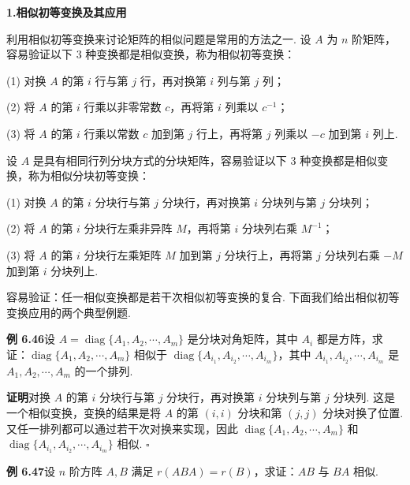 \documentclass[UTF8, 12pt, fontset=fandol, oneside]{ctexart}
\begin{document}
\noindent\textbf{1.\quad 相似初等变换及其应用}

利用相似初等变换来讨论矩阵的相似问题是常用的方法之一. 设 $A$ 为 $n$ 阶矩阵，容易验证以下 3 种变换都是相似变换，称为相似初等变换：

(1) 对换 $A$ 的第 $i$ 行与第 $j$ 行，再对换第 $i$ 列与第 $j$ 列；

(2) 将 $A$ 的第 $i$ 行乘以非零常数 $c$，再将第 $i$ 列乘以 $c^{-1}$；

(3) 将 $A$ 的第 $i$ 行乘以常数 $c$ 加到第 $j$ 行上，再将第 $j$ 列乘以 $-c$ 加到第 $i$ 列上.

设 $A$ 是具有相同行列分块方式的分块矩阵，容易验证以下 3 种变换都是相似变换，称为相似分块初等变换：

(1) 对换 $A$ 的第 $i$ 分块行与第 $j$ 分块行，再对换第 $i$ 分块列与第 $j$ 分块列；

(2) 将 $A$ 的第 $i$ 分块行左乘非异阵 $M$，再将第 $i$ 分块列右乘 $M^{-1}$；

(3) 将 $A$ 的第 $i$ 分块行左乘矩阵 $M$ 加到第 $j$ 分块行上，再将第 $j$ 分块列右乘 $-M$ 加到第 $i$ 分块列上.

容易验证：任一相似变换都是若干次相似初等变换的复合. 下面我们给出相似初等变换应用的两个典型例题.

\noindent\textbf{例 6.46}\quad 设 $A=\operatorname{diag}\{A_1,A_2,\cdots,A_m\}$ 是分块对角矩阵，其中 $A_i$ 都是方阵，求证：$\operatorname{diag}\{A_1,A_2,\cdots,A_m\}$ 相似于 $\operatorname{diag}\{A_{i_1},A_{i_2},\cdots,A_{i_m}\}$，其中 $A_{i_1},A_{i_2},\cdots,A_{i_m}$ 是 $A_1,A_2,\cdots,A_m$ 的一个排列.

\noindent\textbf{证明}\quad 对换 $A$ 的第 $i$ 分块行与第 $j$ 分块行，再对换第 $i$ 分块列与第 $j$ 分块列. 这是一个相似变换，变换的结果是将 $A$ 的第 $(i,i)$ 分块和第 $(j,j)$ 分块对换了位置. 又任一排列都可以通过若干次对换来实现，因此 $\operatorname{diag}\{A_1,A_2,\cdots,A_m\}$ 和 $\operatorname{diag}\{A_{i_1},A_{i_2},\cdots,A_{i_m}\}$ 相似. $\square$

\noindent\textbf{例 6.47}\quad 设 $n$ 阶方阵 $A,B$ 满足 $r(ABA)=r(B)$，求证：$AB$ 与 $BA$ 相似.
\end{document}
